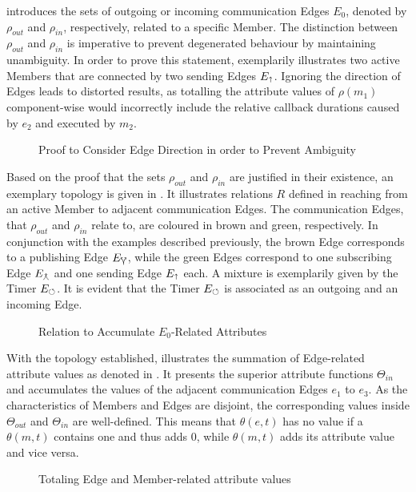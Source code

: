      introduces the sets of outgoing or incoming communication Edges $E_0$, denoted by $\rho_{out}$ and $\rho_{in}$, respectively, related to a specific Member.
    The distinction between $\rho_{out}$ and $\rho_{in}$ is imperative to prevent degenerated behaviour by maintaining unambiguity. In order to prove this statement,  exemplarily illustrates two active Members that are connected by two sending Edges $E_{\text{$\shortuparrow$}}$. Ignoring the direction of Edges leads to distorted results, as totalling the attribute values of $\rho(m_1)$ component-wise would incorrectly include the relative callback durations caused by $e_2$ and executed by $m_2$.
    \begin{figure}[h]
        \centering
        
        \caption[Proof to Consider Edge Direction in order to Prevent Ambiguity]{Proof to Consider Edge Direction in order to Prevent Ambiguity \legend} \label{fig:tikz:mathModel:rhosunambiguity}
    \end{figure}

    Based on the proof that the sets $\rho_{out}$ and $\rho_{in}$ are justified in their existence, an exemplary topology is given in . It illustrates relations $R$ defined in  reaching from an active Member to adjacent communication Edges. The communication Edges, that $\rho_{out}$ and $\rho_{in}$ relate to, are coloured in brown and green, respectively. In conjunction with the examples described previously, the brown Edge corresponds to a publishing Edge $E_{\text{$\curlyveeuparrow$}}$, while the green Edges correspond to one subscribing Edge $E_{\text{$\curlywedgeuparrow$}}$ and one sending Edge $E_{\text{$\shortuparrow$}}$ each. A mixture is exemplarily given by the Timer $E_{\text{$\circlearrowleft$}}$. It is evident that the Timer $E_{\text{$\circlearrowleft$}}$ is associated as an outgoing and an incoming Edge.
    \begin{figure}[h]
        \centering
        
        \caption[Relation to Accumulate Adjacent Communication Edges]{Relation to Accumulate $E_0$-Related Attributes \legendadapted} \label{fig:tikz:mathModel:extendedTree}
    \end{figure}

    With the topology established,  illustrates the summation of Edge-related attribute values as denoted in .
    It presents the superior attribute functions $\Theta_{in}$ and accumulates the values of the adjacent communication Edges $e_1$ to $e_3$. As the characteristics of Members and Edges are disjoint, the corresponding values inside $\Theta_{out}$ and $\Theta_{in}$ are well-defined. This means that $\theta(e,t)$ has no value if a $\theta(m,t)$ contains one and thus adds $0$, while $\theta(m,t)$ adds its attribute value and vice versa.
    \begin{figure}[h]
        \centering
        
        \caption{Totaling Edge and Member-related attribute values} \label{fig:tikz:mathModel:accEdges}
    \end{figure}

